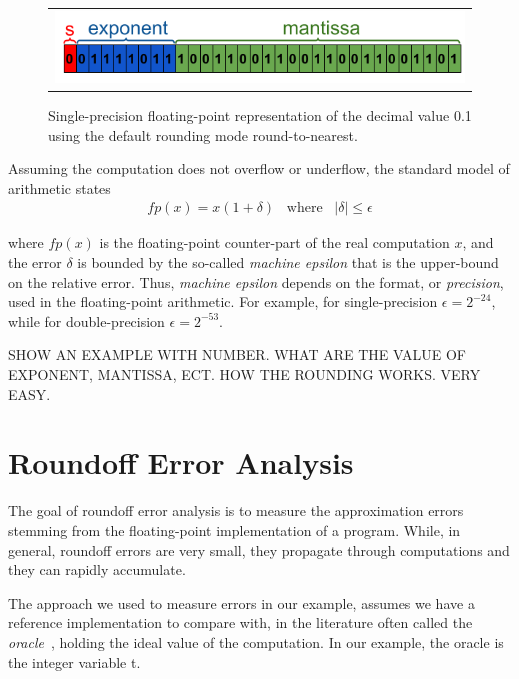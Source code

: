 %
\begin{figure}[h!]
	\centering
	\begin{tabular}{l}
		\includegraphics[width=1.0\textwidth]{pic/examplenumber.png}
	\end{tabular}
	\caption{Single-precision floating-point representation of the decimal value 0.1 using the default rounding mode round-to-nearest.}
	\label{fig:line}
\end{figure}
%
Assuming the computation does not overflow or underflow, the standard model of arithmetic states
%
\begin{align}
fp(x)=x(1+\delta)\;\;\;\text{where}\;\;\;|\delta|\leq\epsilon
\label{standard}
\end{align}
%

where $fp(x)$ is the floating-point counter-part of the real computation $x$, and the error $\delta$ is bounded by the so-called \emph{machine epsilon} that is the upper-bound on the relative error. Thus, \emph{machine epsilon} depends on the format, or \emph{precision}, used in the floating-point arithmetic. For example, for single-precision $\epsilon=2^{-24}$, while for double-precision $\epsilon=2^{-53}$.
%

SHOW AN EXAMPLE WITH NUMBER. WHAT ARE THE VALUE OF EXPONENT, MANTISSA, ECT. HOW THE ROUNDING WORKS. VERY EASY.

%
\section{Roundoff Error Analysis}
%
The goal of roundoff error analysis is to measure the approximation errors stemming from the floating-point implementation of a program.
%
While, in general, roundoff errors are very small, they propagate through computations and they can rapidly accumulate.
%
%
%

The approach we used to measure errors in our example, assumes we have a reference implementation to compare with, in the literature often called the \emph{oracle}~\cite{blame}, holding the ideal value of the computation.
%
In our example, the oracle is the integer variable t.
% 

